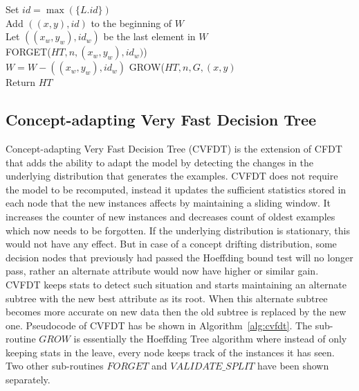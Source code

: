 \documentclass[a4paper, 11pt, oneside]{book}
\begin{document}
\begin{algorithm}[htbp]
{{            Set $id = \max(\{L.id\})$ \\
            Add $((x, y), id)$ to the beginning of $W$ \\
             {
                Let $((x_w, y_w), id_w)$ be the last element in $W$ \\
                FORGET($HT, n, (x_w, y_w), id_w)$) \label{algln:cvfdt:forget} \\
                $W = W - ((x_w, y_w), id_w)$
            }
            GROW($HT, n, G, (x,y)$ \\
        }
        Return $HT$
    }
\end{algorithm}
\subsection{Concept-adapting Very Fast Decision Tree}
Concept-adapting Very Fast Decision Tree (CVFDT) is the extension of CFDT that adds the ability to adapt the model by detecting the changes in the underlying distribution that generates the examples. CVFDT does not require the model to be recomputed, instead it updates the sufficient statistics stored in each node that the new instances affects by maintaining a sliding window. It increases the counter of new instances and decreases count of oldest examples which now needs to be forgotten. If the underlying distribution is stationary, this would not have any effect. But in case of a concept drifting distribution, some decision nodes that previously had passed the Hoeffding bound test will no longer pass, rather an alternate attribute would now have higher or similar gain. CVFDT keeps stats to detect such situation and starts maintaining an alternate subtree with the new best attribute as its root. When this alternate subtree becomes more accurate on new data then the old subtree is replaced by the new one. Pseudocode of CVFDT has be shown in Algorithm~\ref{alg:cvfdt}. The sub-routine $GROW$ is essentially the Hoeffding Tree algorithm where instead of only keeping stats in the leave, every node keeps track of the instances it has seen. Two other sub-routines $FORGET$ and $VALIDATE\_SPLIT$ have been shown separately.
\end{document}
